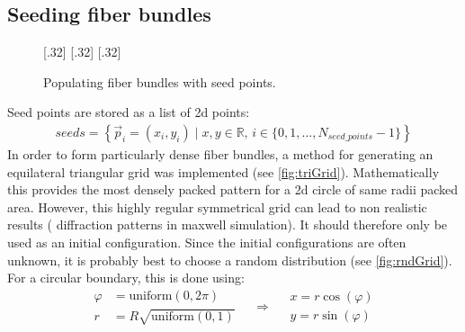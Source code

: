 \subsection{Seeding fiber bundles}\label{sec:seeds}
%
\begin{figure}[!t]
    \def\tikzheight{0.25\textwidth}
    \centering
    [.32\textwidth]{
    }
    \hfill
    [.32\textwidth]{
    }
    \hfill
    [.32\textwidth]{
    }
	\caption{Populating fiber bundles with seed points.}
\end{figure}
%
Seed points are stored as a list of 2d points:
\begin{align}
\mathit{seeds} = \left\{ \vec{p}_i=(x_i,y_i) \mid x,y \in \mathbb{R} , \, i \in \{0,1,...,N_{\mathit{seed\_points}}-1\}\right\}
\end{align}
%
In order to form particularly dense fiber bundles, a method for generating an equilateral triangular grid was implemented (see \ref{fig:triGrid}).
Mathematically this provides the most densely packed pattern for a 2d circle of same radii packed area.
However, this highly regular symmetrical grid can lead to non realistic results (\eg{} diffraction patterns in maxwell simulation).
It should therefore only be used as an initial configuration.
Since the initial configurations are often unknown, it is probably best to choose a random distribution (see \cref{fig:rndGrid}).
For a circular boundary, this is done using:
\begin{equation}
\begin{split}
\varphi &= \mathrm{uniform}(0,2 \pi) \\
r &= R \sqrt{\mathrm{uniform}(0,1)}
\end{split}
\quad\Rightarrow\quad
\begin{split}
x = r \cos(\varphi)\\
y = r \sin(\varphi)
\end{split}
\end{equation}
%
%
%
